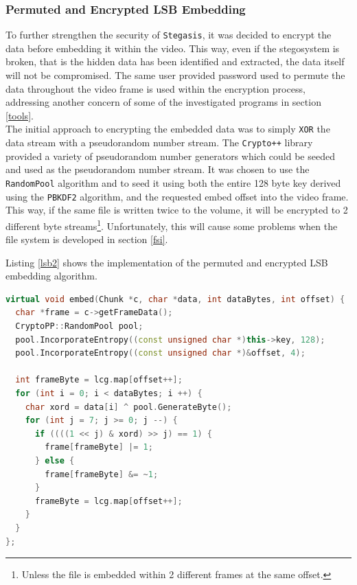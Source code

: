 \documentclass[paper=a4, fontsize=11pt,twoside]{scrartcl}    %
\numberwithin{table}{section}
\numberwithin{figure}{section}
\numberwithin{algorithm}{section}
\begin{document}
\subsubsection{Permuted and Encrypted LSB Embedding}

To further strengthen the security of \texttt{Stegasis}, it was decided to encrypt the data before embedding it within the video. This way, even if the stegosystem is broken, that is the hidden data has been identified and extracted, the data itself will not be compromised. The same user provided password used to permute the data throughout the video frame is used within the encryption process, addressing another concern of some of the investigated programs in section \ref{tools}.\\

\noindent
The initial approach to encrypting the embedded data was to simply \texttt{XOR} the data stream with a pseudorandom number stream. The \texttt{Crypto++} library provided a variety of pseudorandom number generators which could be seeded and used as the pseudorandom number stream. It was chosen to use the \texttt{RandomPool} algorithm and to seed it using both the entire 128 byte key derived using the \texttt{PBKDF2} algorithm, and the requested embed offset into the video frame. This way, if the same file is written twice to the volume, it will be encrypted to 2 different byte streams\footnote{Unless the file is embedded within 2 different frames at the same offset.}. Unfortunately, this will cause some problems when the file system is developed in section \ref{fsi}.

Listing \ref{lsb2} shows the implementation of the permuted and encrypted LSB embedding algorithm.

\begin{lstlisting}[language=C++, caption={Encrypted and permuted embedding (\texttt{steg/lsb2\_algorithm.cc:41})}, frame=single, label=lsb2,float,floatplacement=H]
virtual void embed(Chunk *c, char *data, int dataBytes, int offset) {
  char *frame = c->getFrameData();
  CryptoPP::RandomPool pool;
  pool.IncorporateEntropy((const unsigned char *)this->key, 128);
  pool.IncorporateEntropy((const unsigned char *)&offset, 4);
  
  int frameByte = lcg.map[offset++];
  for (int i = 0; i < dataBytes; i ++) {
    char xord = data[i] ^ pool.GenerateByte();
    for (int j = 7; j >= 0; j --) {
      if ((((1 << j) & xord) >> j) == 1) {
        frame[frameByte] |= 1;
      } else {
        frame[frameByte] &= ~1;
      }
      frameByte = lcg.map[offset++];
    }
  }
};
\end{lstlisting}
\end{document}
